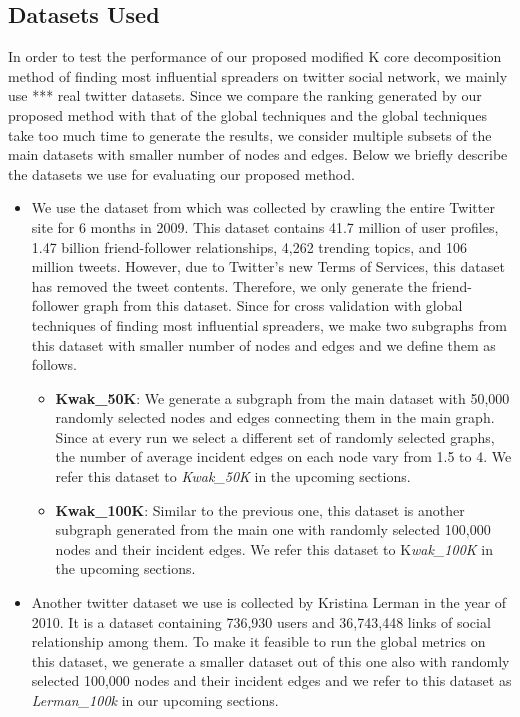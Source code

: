 \documentclass[sigconf]{acmart}
\begin{document}
\subsection{Datasets Used}
In order to test the performance of our proposed modified K core decomposition method of finding most influential spreaders on twitter social network, we mainly use *** real twitter datasets. Since we compare the ranking generated by our proposed method with that of the global techniques and the global techniques take too much time to generate the results, we consider multiple subsets of the main datasets with smaller number of nodes and edges. Below we briefly describe the datasets we use for evaluating our proposed method.

\begin{itemize}
	\item We use the dataset from \cite{Kwak10www} which was collected by crawling the entire Twitter site for 6 months in 2009. This dataset contains 41.7 million of user profiles, 1.47 billion friend-follower relationships, 4,262 trending topics, and 106 million tweets. However, due to Twitter's new Terms of Services, this dataset has removed the tweet contents. Therefore, we only generate the friend-follower graph from this dataset. Since for cross validation with global techniques of finding most influential spreaders, we make two subgraphs from this dataset with smaller number of nodes and edges and we define them as follows.
	\begin{itemize}
		\item \textbf{Kwak\_50K}: We generate a subgraph from the main dataset with 50,000 randomly selected nodes and edges connecting them in the main graph. Since at every run we select a different set of randomly selected graphs, the number of average incident edges on each node vary from 1.5 to 4. We refer this dataset to \textit{Kwak\_50K} in the upcoming sections.
		\item \textbf{Kwak\_100K}: Similar to the previous one, this dataset is another subgraph generated from the main one with randomly selected 100,000 nodes and their incident edges. We refer this dataset to K\textit{wak\_100K} in the upcoming sections.
	\end{itemize}

	\item Another twitter dataset we use is collected by Kristina Lerman \cite{Lerman2010} in the year of 2010. It is a dataset containing 736,930 users and 36,743,448 links of social relationship among them. To make it feasible to run the global metrics on this dataset, we  generate a smaller dataset out of this one also with randomly selected 100,000 nodes and their incident edges and we refer to this dataset as \textit{Lerman\_100k} in our upcoming sections.
	

\end{itemize}
\end{document}
